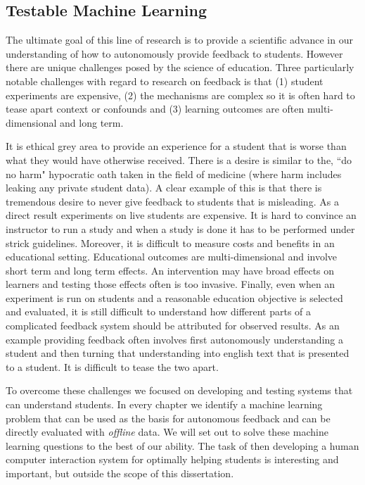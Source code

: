 \subsection{Testable Machine Learning}

The ultimate goal of this line of research is to provide a scientific advance in our understanding of how to autonomously provide feedback to students. However there are unique challenges posed by the science of education. Three particularly notable challenges with regard to research on feedback is that (1) student experiments are expensive, (2) the mechanisms are complex so it is often hard to tease apart context or confounds and (3) learning outcomes are often multi-dimensional and long term.

It is ethical grey area to provide an experience for a student that is worse than what they would have otherwise received. There is a desire is similar to the, ``do no harm" hypocratic oath taken in the field of medicine (where harm includes leaking any private student data). A clear example of this is that there is tremendous desire to never give feedback to students that is misleading. As a direct result experiments on live students are expensive. It is hard to convince an instructor to run a study and when a study is done it has to be performed under strick guidelines. Moreover, it is difficult to measure costs and benefits in an educational setting. Educational outcomes are multi-dimensional and involve short term and long term effects. An intervention may have broad effects on learners and testing those effects often is too invasive. Finally, even when an experiment is run on students and a reasonable education objective is selected and evaluated, it is still difficult to understand how different parts of a complicated feedback system should be attributed for observed results. As an example providing feedback often involves first autonomously understanding a student and then turning that understanding into english text that is presented to a student. It is difficult to tease the two apart.

To overcome these challenges we focused on developing and testing systems that can understand students. In every chapter we identify a machine learning problem that can be used as the basis for autonomous feedback and can be directly evaluated with \emph{offline} data. We will set out to solve these machine learning questions to the best of our ability. The task of then developing a human computer interaction system for optimally helping students is interesting and important, but outside the scope of this dissertation.

